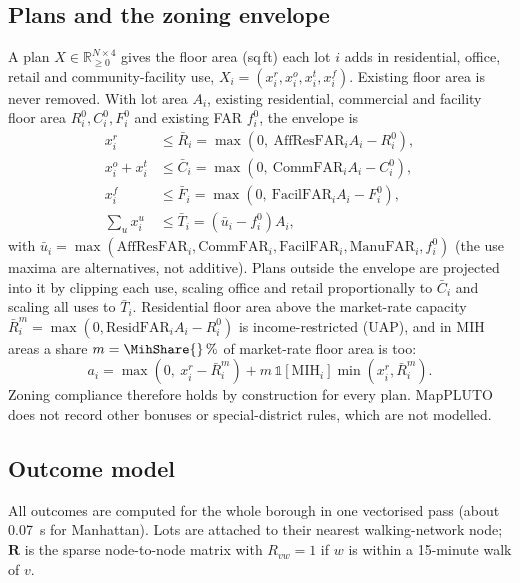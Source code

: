 \documentclass[preprint,12pt]{elsarticle}
\begin{document}
\subsection{Plans and the zoning envelope}\label{sec:envelope}
A plan $X\in\mathbb{R}_{\ge0}^{N\times4}$ gives the floor area (sq\,ft) each lot $i$ adds in residential, office, retail and community-facility use, $X_i=(x^{r}_i,x^{o}_i,x^{t}_i,x^{f}_i)$. Existing floor area is never removed. With lot area $A_i$, existing residential, commercial and facility floor area $R^0_i,C^0_i,F^0_i$ and existing FAR $f^0_i$, the envelope is
\begin{equation}
\begin{aligned}
x^r_i &\le \bar R_i = \max(0,\ \mathrm{AffResFAR}_i A_i - R^0_i),\\
x^o_i + x^t_i &\le \bar C_i = \max(0,\ \mathrm{CommFAR}_i A_i - C^0_i),\\
x^f_i &\le \bar F_i = \max(0,\ \mathrm{FacilFAR}_i A_i - F^0_i),\\
\textstyle\sum_u x^u_i &\le \bar T_i = (\bar u_i - f^0_i) A_i,
\end{aligned}
\end{equation}
with $\bar u_i=\max(\mathrm{AffResFAR}_i,\mathrm{CommFAR}_i,\mathrm{FacilFAR}_i,\mathrm{ManuFAR}_i,f^0_i)$ (the use maxima are alternatives, not additive). Plans outside the envelope are projected into it by clipping each use, scaling office and retail proportionally to $\bar C_i$ and scaling all uses to $\bar T_i$. Residential floor area above the market-rate capacity $\bar R^{m}_i=\max(0,\mathrm{ResidFAR}_iA_i-R^0_i)$ is income-restricted (UAP), and in MIH areas a share $m=\MihShare{}\,\%$ of market-rate floor area is too:
\begin{equation}
a_i = \max(0,\ x^r_i - \bar R^m_i) + m\,\mathbb{1}[\mathrm{MIH}_i]\min(x^r_i,\bar R^m_i).
\end{equation}
Zoning compliance therefore holds by construction for every plan. MapPLUTO does not record other bonuses or special-district rules, which are not modelled.

\subsection{Outcome model}\label{sec:outcomes}
All outcomes are computed for the whole borough in one vectorised pass (about 0.07~s for Manhattan). Lots are attached to their nearest walking-network node; $\mathbf R$ is the sparse node-to-node matrix with $R_{vw}=1$ if $w$ is within a 15-minute walk of $v$.
\end{document}
